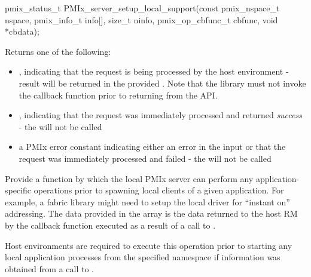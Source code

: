 \format

\cspecificstart
\begin{codepar}
pmix_status_t
PMIx_server_setup_local_support(const pmix_nspace_t nspace,
                                pmix_info_t info[], size_t ninfo,
                                pmix_op_cbfunc_t cbfunc,
                                void *cbdata);
\end{codepar}
\cspecificend

\begin{arglist}
\end{arglist}

Returns one of the following:

\begin{itemize}
    \item {}, indicating that the request is being processed by the host environment - result will be returned in the provided . Note that the library must not invoke the callback function prior to returning from the \ac{API}.
    \item {}, indicating that the request was immediately processed and returned \textit{success} - the  will not be called
    \item a PMIx error constant indicating either an error in the input or that the request was immediately processed and failed - the  will not be called
\end{itemize}


\descr

Provide a function by which the local \ac{PMIx} server can perform any application-specific operations prior to spawning local clients of a given application. For example, a fabric library might need to setup the local driver for ``instant on'' addressing. The data provided in the  array is the data returned to the host \ac{RM} by the callback function executed as a result of a call to .

\advicermstart
Host environments are required to execute this operation prior to starting any local application processes from the specified namespace if information was obtained from a call to .


